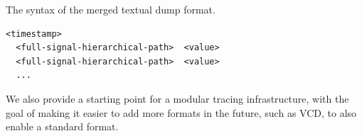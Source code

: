 \begin{listing}[ht]
    \caption{The syntax of the merged textual dump format.}
    \label{listing:merged-syntax}
    \centering
    \begin{minipage}{0.6\textwidth}
        \begin{verbatim}
<timestamp>
  <full-signal-hierarchical-path>  <value>
  <full-signal-hierarchical-path>  <value>
  ...
            \end{verbatim}
    \end{minipage}
\end{listing}

We also provide a starting point for a modular tracing infrastructure, with the goal of making it easier to add more formats in the future, such as VCD, to also enable a standard format.

